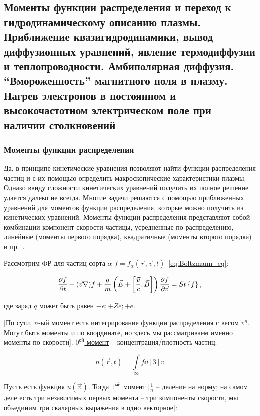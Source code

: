 \documentclass[10pt, a4paper]{article}
\begin{document}
\subsection{Моменты функции распределения и переход к гидродинамическому описанию плазмы. Приближение квазигидродинамики, вывод диффузионных уравнений, явление термодиффузии и теплопроводности. Амбиполярная диффузия. ``Вмороженность'' магнитного поля в плазму. Нагрев электронов в постоянном и высокочастотном электрическом поле при наличии столкновений}

\subsubsection{Моменты функции распределения}

Да, в принципе кинетические уравнения позволяют найти функции распределения частиц и с их помощью определить макроскопические характеристики плазмы. Однако ввиду сложности кинетических уравнений получить их полное решение удается далеко не всегда. Многие задачи решаются с помощью приближенных уравнений для моментов функции распределения, которые можно получить из кинетических уравнений. Моменты функции распределения представляют собой комбинации компонент скорости частицы, усредненные по распределению, -- линейные (моменты первого порядка), квадратичные (моменты второго порядка) и пр.~\cite{golant}.

Рассмотрим ФР для частиц сорта $\alpha$ $f=f_\alpha(\vec{r}, \vec{v}, t)$~\eqref{eq:Boltzmann_eq}:

\begin{equation*}
	\pdv{f}{t}+(\vec{v}\nabla)f+\frac{q}{m}\left(\vec{E}+\left[\frac{\vec{v}}{c}, \vec{B}\right]\right)\pdv{f}{\vec{v}}=St\left\lbrace f\right\rbrace,
\end{equation*}

где заряд $q$ может быть равен $-e; +Ze; +e$.

[По сути, $n$-ый момент есть интегрирование функции распределения с весом $v^n$. Могут быть моменты и по координате, но здесь мы рассматриваем именно моменты по скорости]. \uline{$0^\text{ой}$ момент} -- концентрация/плотность частиц:

\begin{equation*}
	n(\vec{r}, t) = \int\limits_{\infty} f\dd[3]{v}
\end{equation*}

Пусть есть функция $u(\vec{v})$. Тогда \uline{$1^\text{ый}$ момент} [$\frac{1}{n}$ -- деление на норму; на самом деле есть три независимых первых момента -- три компоненты скорости, мы объединим три скалярных выражения в одно векторное]:
\end{document}
